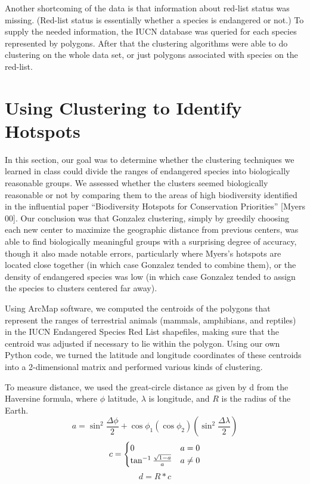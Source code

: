 \documentclass[11pt, fullpage,letterpaper]{article}
\renewcommand{\cite}[1]{[#1]}
\begin{document}
		Another shortcoming of the data is that information about red-list status was missing. (Red-list status is essentially whether a species is endangered or not.) To supply the needed information, the IUCN database was queried for each species represented by polygons. After that the clustering algorithms were able to do clustering on the whole data set, or just polygons associated with species on the red-list. 
	
	\section{Using Clustering to Identify Hotspots}
		In this section, our goal was to determine whether the clustering techniques we learned in class could divide the ranges of endangered species into biologically reasonable groups. We assessed whether the clusters seemed biologically reasonable or not by comparing them to the areas of high biodiversity identified in the influential paper ``Biodiversity Hotspots for Conservation Priorities'' \cite{Myers 00}. Our conclusion was that Gonzalez clustering, simply by greedily choosing each new center to maximize the geographic distance from previous centers, was able to find biologically meaningful groups with a surprising degree of accuracy, though it also made notable errors, particularly where Myers's hotspots are located close together (in which case Gonzalez tended to combine them), or the density of endangered species was low (in which case Gonzalez tended to assign the species to clusters centered far away).
		 
		Using ArcMap software, we computed the centroids of the polygons that represent the ranges of terrestrial animals (mammals, amphibians, and reptiles) in the IUCN Endangered Species Red List shapefiles, making sure that the centroid was adjusted if necessary to lie within the polygon. Using our own Python code, we turned the latitude and longitude coordinates of these centroids into a 2-dimensional matrix and performed various kinds of clustering.
				
		To measure distance, we used the great-circle distance as given by d from the Haversine formula, where $\phi$ latitude, $\lambda$ is longitude, and $R$ is the radius of the Earth.
		\begin{equation}
			a = \sin^2 \frac{\Delta\phi}{2} + \cos \phi_1 (\cos \phi_2)  (\sin^2 \frac{\Delta\lambda}{2})
		\end{equation}
		\begin{equation}
			c =  \begin{cases} 
					0 & a = 0 \cr \tan^{-1}{\frac{\sqrt{1-a}}{a}} & a \neq 0
				\end{cases}
		\end{equation}
		\begin{equation}
			d = R*c
		\end{equation}
	
\end{document}
